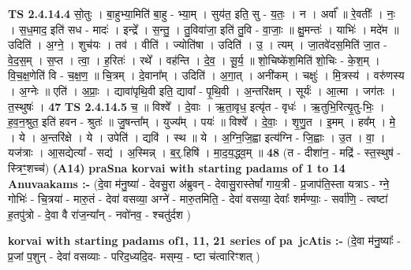 \documentclass[17pt]{extarticle}
\begin{document}
                  \newline
                                \textbf{ TS 2.4.14.4} \newline
                  सो॒तुः । बा॒हुभ्या॒मिति॑ बा॒हु - भ्या॒म् । सुय॑त॒ इति॒ सु - य॒तः॒ । न । अर्वा᳚ ॥ रे॒वतीः᳚ । नः॒ । स॒ध॒माद॒ इति॑ सध - मादः॑ । इन्द्रे᳚ । स॒न्तु॒ । तु॒विवा॑जा॒ इति॑ तु॒वि - वा॒जाः॒ ॥ क्षु॒मन्तः॑ । याभिः॑ । मदे॑म ॥ उदिति॑ । अ॒ग्ने॒ । शुच॑यः । तव॑ । वीति॑ । ज्योति॑षा । उदिति॑ । उ॒ । त्यम् । जा॒तवे॑दस॒मिति॑ जा॒त - वे॒द॒स॒म् । स॒प्त । त्वा॒ । ह॒रितः॑ । रथे᳚ । वह॑न्ति । दे॒व॒ । सू॒र्य॒ ॥ शो॒चिष्के॑श॒मिति॑ शो॒चिः - के॒श॒म् । वि॒च॒क्ष॒णेति॑ वि -  च॒क्ष॒ण॒ ॥ चि॒त्रम् । दे॒वाना᳚म् । उदिति॑ । अ॒गा॒त् । अनी॑कम् । चक्षुः॑ । मि॒त्रस्य॑ । वरु॑णस्य ।   अ॒ग्नेः ॥ एति॑ । अ॒प्राः॒ । द्यावा॑पृथि॒वी इति॒ द्यावा᳚ - पृ॒थि॒वी । अ॒न्तरि॑क्षम् । सूर्यः॑ । आ॒त्मा ।   जग॑तः । त॒स्थुषः॑ । \textbf{  47} \newline
                  \newline
                                \textbf{ TS 2.4.14.5} \newline
                  च॒ ॥ विश्वे᳚ । दे॒वाः । ऋ॒ता॒वृध॒ इत्यृ॑त - वृधः॑ । ऋ॒तुभि॒रित्यृ॒तु-भिः॒ । ह॒व॒न॒श्रुत॒ इति॑ हवन - श्रुतः॑ ॥ जु॒षन्ता᳚म् । युज्य᳚म् ।    पयः॑ ॥ विश्वे᳚ । दे॒वाः॒ । शृ॒णु॒त । इ॒मम् । हव᳚म् । मे॒ । ये । अ॒न्तरि॑क्षे । ये । उपेति॑ । द्यवि॑ । स्थ ॥ ये । अ॒ग्नि॒जि॒ह्वा इत्य॑ग्नि - जि॒ह्वाः । उ॒त । वा॒ । यज॑त्राः । आ॒सद्येत्या᳚ - सद्य॑ । अ॒स्मिन्न् । ब॒र्॒.हिषि॑ । मा॒द॒य॒द्ध्व॒म् ॥ \textbf{  48} \newline
                  \newline
                      (त - दीशा॑न॒ - मद्रि॑ - स्त॒स्थुष॑ - स्त्रिꣳ॒॒शच्च॑)  \textbf{(A14)} \newline \newline
\textbf{praSna korvai with starting padams of 1 to 14 Anuvaakams :-} \newline
(दे॒वा म॑नु॒ष्या॑ - देवसु॒रा अ॑ब्रुवन् - देवासु॒रास्तेषां᳚ गाय॒त्री - प्र॒जाप॑ति॒स्ता यत्राऽ - ग्ने॒ गोभिः॑ - चि॒त्रया॑ - मारु॒तं - देवा॑ वसव्या॒ अग्ने॑ - मारु॒तमिति॒ - देवा॑ वसव्या॒ देवाः᳚ शर्मण्याः॒ - सर्वा॑णि॒ - त्वष्टा॑ ह॒तपु॑त्रो - दे॒वा वै रा॑ज॒न्या᳚न् - नवो॑नव॒ - श्चतु॑र्दश ) \newline

\textbf{korvai with starting padams of1, 11, 21 series of pa~jcAtis :-} \newline
(दे॒वा म॑नु॒ष्याः᳚ - प्र॒जां प॒शुन् - देवा॑ वसव्याः - परिद॒ध्यदि॒द- मस्‌म्य॒ - ष्टा च॑त्वारिꣳशत् ) \newline
\end{document}
